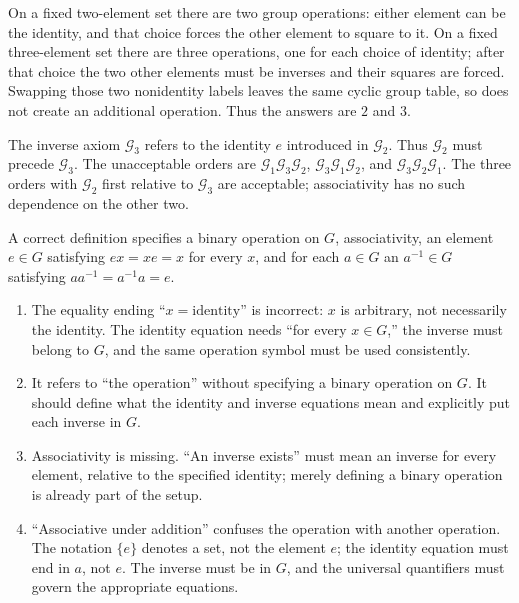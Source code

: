 
On a fixed two-element set there are two group operations: either element can be the identity, and that choice forces the other element to square to it. On a fixed three-element set there are three operations, one for each choice of identity; after that choice the two other elements must be inverses and their squares are forced. Swapping those two nonidentity labels leaves the same cyclic group table, so does not create an additional operation. Thus the answers are $2$ and $3$.


The inverse axiom $\mathcal G_3$ refers to the identity $e$ introduced in $\mathcal G_2$. Thus $\mathcal G_2$ must precede $\mathcal G_3$. The unacceptable orders are $\mathcal G_1\mathcal G_3\mathcal G_2$, $\mathcal G_3\mathcal G_1\mathcal G_2$, and $\mathcal G_3\mathcal G_2\mathcal G_1$. The three orders with $\mathcal G_2$ first relative to $\mathcal G_3$ are acceptable; associativity has no such dependence on the other two.


A correct definition specifies a binary operation on $G$, associativity, an element $e\in G$ satisfying $ex=xe=x$ for every $x$, and for each $a\in G$ an $a^{-1}\in G$ satisfying $aa^{-1}=a^{-1}a=e$.
\begin{enumerate}[label=(\alph*)]
\item The equality ending ``$x=\text{identity}$'' is incorrect: $x$ is arbitrary, not necessarily the identity. The identity equation needs ``for every $x\in G$,'' the inverse must belong to $G$, and the same operation symbol must be used consistently.
\item It refers to ``the operation'' without specifying a binary operation on $G$. It should define what the identity and inverse equations mean and explicitly put each inverse in $G$.
\item Associativity is missing. ``An inverse exists'' must mean an inverse for every element, relative to the specified identity; merely defining a binary operation is already part of the setup.
\item ``Associative under addition'' confuses the operation with another operation. The notation $\{e\}$ denotes a set, not the element $e$; the identity equation must end in $a$, not $e$. The inverse must be in $G$, and the universal quantifiers must govern the appropriate equations.
\end{enumerate}

